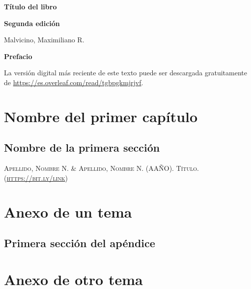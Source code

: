 \documentclass[a5paper,12pt,twoside]{book}
\begin{document}
\pagestyle{fancy}
\fancyhf{}
\chead{\scriptsize \nouppercase\rightmark}
\cfoot{\scriptsize \thepage}
\renewcommand{\headrulewidth}{0pt}

\frontmatter
% 

\begin{center}
    \begin{Huge}
        \textbf{Título del libro}
    \end{Huge}

    \vspace{1cm}
    \textbf{Segunda edición}
    \vspace{2cm}

    \begin{Large}
        Malvicino, Maximiliano R.
    \end{Large}
\end{center}

\clearpage
\noindent
\textbf{Prefacio}

La versión digital más reciente de este texto puede ser descargada gratuitamente de \url{https://es.overleaf.com/read/tgbpgkmjrjvf}.

\renewcommand{\spanishappendixname}{Anexo}
\tableofcontents

\mainmatter
{}


\chapter{Nombre del primer capítulo}


\section{Nombre de la primera sección}


\begin{thebibliography}{1}
     \textsc{Apellido, Nombre N. \& Apellido, Nombre N. (AAÑO). Título. \\ (\url{https://bit.ly/link}})
\end{thebibliography}


\appendix


\chapter{Anexo de un tema}


\section{Primera sección del apéndice}


\chapter{Anexo de otro tema}
\end{document}
